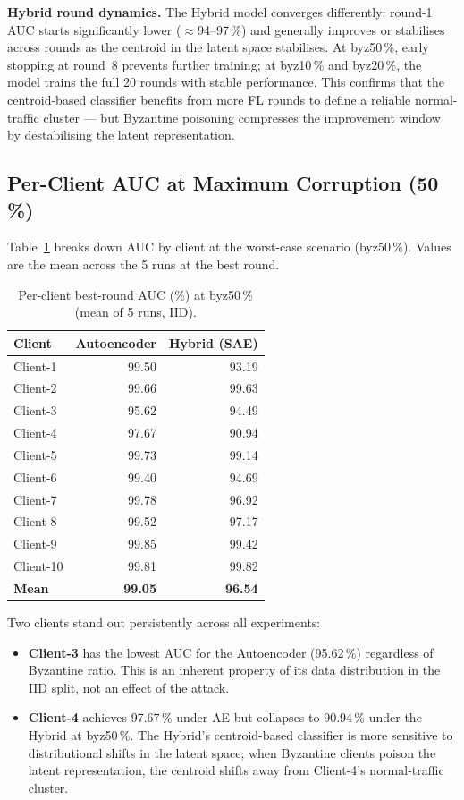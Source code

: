 \documentclass[11pt,a4paper]{article}
\begin{document}
\noindent\textbf{Hybrid round dynamics.}
The Hybrid model converges differently: round-1 AUC starts significantly lower
($\approx$94--97\,\%) and generally improves or stabilises across rounds as the centroid
in the latent space stabilises.
At byz50\,\%, early stopping at round~8 prevents further training; at byz10\,\% and
byz20\,\%, the model trains the full 20 rounds with stable performance.
This confirms that the centroid-based classifier benefits from more FL rounds to define
a reliable normal-traffic cluster --- but Byzantine poisoning compresses the improvement
window by destabilising the latent representation.

\subsection{Per-Client AUC at Maximum Corruption (50\,\%)}

Table~\ref{tab:perclient} breaks down AUC by client at the worst-case scenario (byz50\,\%).
Values are the mean across the 5 runs at the best round.

\begin{table}[h]
\centering
\caption{Per-client best-round AUC (\%) at byz50\,\% (mean of 5 runs, IID).}
\label{tab:perclient}
\begin{tabular}{l rr}
\toprule
\textbf{Client} & \textbf{Autoencoder} & \textbf{Hybrid (SAE)} \\
\midrule
Client-1   & 99.50  & 93.19 \\
Client-2   & 99.66  & 99.63 \\
Client-3   & 95.62  & 94.49 \\
Client-4   & 97.67  & 90.94 \\
Client-5   & 99.73  & 99.14 \\
Client-6   & 99.40  & 94.69 \\
Client-7   & 99.78  & 96.92 \\
Client-8   & 99.52  & 97.17 \\
Client-9   & 99.85  & 99.42 \\
Client-10  & 99.81  & 99.82 \\
\midrule
\textbf{Mean} & \textbf{99.05} & \textbf{96.54} \\
\bottomrule
\end{tabular}
\end{table}

Two clients stand out persistently across all experiments:

\begin{itemize}[leftmargin=1.5em]
  \item \textbf{Client-3} has the lowest AUC for the Autoencoder (95.62\,\%) regardless of Byzantine ratio.
        This is an inherent property of its data distribution in the IID split, not an effect of the attack.
  \item \textbf{Client-4} achieves 97.67\,\% under AE but collapses to 90.94\,\% under the Hybrid at byz50\,\%.
        The Hybrid's centroid-based classifier is more sensitive to distributional shifts in the latent space;
        when Byzantine clients poison the latent representation, the centroid shifts away from Client-4's
        normal-traffic cluster.
\end{itemize}
\end{document}
